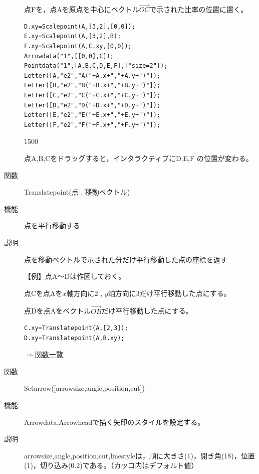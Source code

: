 \documentclass[papersize,a4paper,12pt,uplatex]{jsarticle}
\begin{document}
\begin{description}
点Fを，点Aを原点を中心にベクトル$\overrightarrow{OC} $で示された比率の位置に置く。
\vspace{-2mm}

\begin{verbatim}
D.xy=Scalepoint(A,[3,2],[0,0]);
E.xy=Scalepoint(A,[3,2],B);
F.xy=Scalepoint(A,C.xy,[0,0]);
Arrowdata("1",[[0,0],C]);
Pointdata("1",[A,B,C,D,E,F],["size=2"]);
Letter([A,"e2","A("+A.x+","+A.y+")"]);
Letter([B,"e2","B("+B.x+","+B.y+")"]);
Letter([C,"e2","C("+C.x+","+C.y+")"]);
Letter([D,"e2","D("+D.x+","+D.y+")"]);
Letter([E,"e2","E("+E.x+","+E.y+")"]);
Letter([F,"e2","F("+F.x+","+F.y+")"]);
\end{verbatim}
\vspace{\baselineskip}

\begin{layer}{150}{0}
\end{layer}

\vspace{40mm}

点A,B,Cをドラッグすると，インタラクティブにD,E,F の位置が変わる。

\vspace{\baselineskip}
\hypertarget{translatepoint}{}
\item[関数]Translatepoint(点 , 移動ベクトル)
\item[機能]点を平行移動する
\item[説明]点を移動ベクトルで示された分だけ平行移動した点の座標を返す

\vspace{\baselineskip}
【例】点A〜Dは作図しておく。

点Cを点Aを$x$軸方向に2 , $y$軸方向に3だけ平行移動した点にする。

点Dを点Aをベクトル$\overrightarrow{OB} $だけ平行移動した点にする。
\begin{verbatim}
C.xy=Translatepoint(A,[2,3]);
D.xy=Translatepoint(A,B.xy);
\end{verbatim}

\hspace{20mm} \scalebox{0.9}{}

\begin{flushright}\hyperlink{functionlist}{$\Rightarrow$関数一覧}\end{flushright}

\vspace{\baselineskip}
\hypertarget{setarrow}{}
\item[関数]Setarrow([arrowsize,angle,position,cut])
\item[機能]Arrowdata,Arrowheadで描く矢印のスタイルを設定する。
\item[説明]arrowsize,angle,position,cut,linestyleは，順に大きさ(1)，開き角(18)，位置(1)，切り込み(0.2)である。（カッコ内はデフォルト値）


\end{description}
\end{document}
